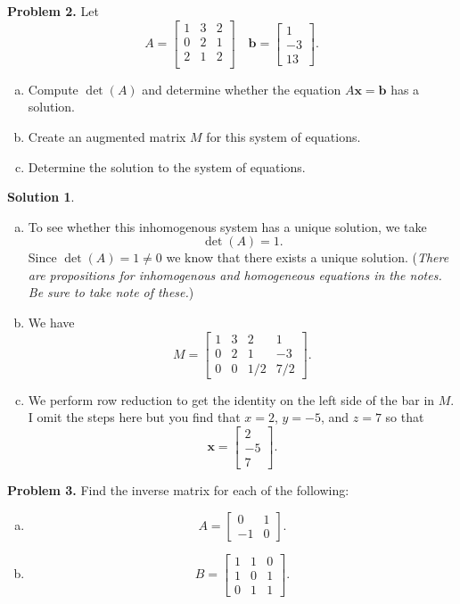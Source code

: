 \documentclass[12pt]{report} %
\theoremstyle{definition}
\newtheorem{solution}{Solution}
\begin{document}
\noindent\textbf{Problem 2.} Let
\[
A=\begin{bmatrix} 1 & 3 & 2 \\ 0 & 2 & 1\\ 2 & 1 & 2\\ \end{bmatrix} \quad \mathbf{b}= \begin{bmatrix} 1 \\ -3 \\ 13 \end{bmatrix}.
\]
\begin{enumerate}[(a)]
    \item Compute $\det(A)$ and determine whether the equation $A\mathbf{x}=\mathbf{b}$ has a solution.
    \item Create an augmented matrix $M$ for this system of equations.
    \item Determine the solution to the system of equations.
\end{enumerate}

\begin{solution}
\begin{enumerate}[(a)]
    \item To see whether this inhomogenous system has a unique solution, we take
    \[
    \det(A)=1.
    \]
    Since $\det(A)=1\neq 0$ we know that there exists a unique solution. (\emph{There are propositions for inhomogenous and homogeneous equations in the notes.  Be sure to take note of these.})
    
    \item We have
    \[
    M=\left[ \begin{array}{ccc|c}
        1 & 3 & 2 & 1\\
        0 & 2 & 1 & -3\\
        0 & 0 & 1/2 & 7/2
    \end{array}\right].
    \]
    
    \item We perform row reduction to get the identity on the left side of the bar in $M$.  I omit the steps here but you find that $x=2$, $y=-5$, and $z=7$ so that
    \[
    \mathbf{x}=\begin{bmatrix} 2 \\ -5 \\ 7 \end{bmatrix}.
    \]
\end{enumerate}
\end{solution}

\noindent\textbf{Problem 3.} Find the inverse matrix for each of the following:
\begin{enumerate}[(a)]
    \item \[
    A=\begin{bmatrix} 0 & 1 \\ -1 & 0 \end{bmatrix}.
    \]
    \item \[
    B=\begin{bmatrix} 1 & 1 & 0\\ 1 & 0 & 1 \\ 0 & 1 & 1 \end{bmatrix}.
    \]
\end{enumerate}
\end{document}
